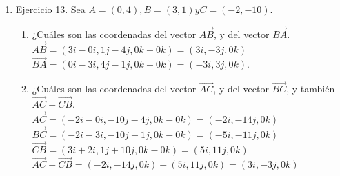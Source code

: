 \documentclass[10pt,letterpaper,fleqn]{article}
\begin{document}
\begin{enumerate}
\begin{enumerate}
          \end{enumerate}

        \item Ejercicio 13. Sea $A = (0, 4), B = (3, 1) y C = (−2, −10)$.
        \begin{enumerate}
          \item ¿Cuáles son las coordenadas del vector $\overrightarrow{AB}$, y
          del vector $\overrightarrow{BA}$. \\
          $\overrightarrow{AB} = (3i-0i,1j-4j,0k-0k) = (3i,-3j,0k)$ \\
          $\overrightarrow{BA} = (0i-3i,4j-1j,0k-0k) = (-3i,3j,0k)$.

          \item ¿Cuáles son las coordenadas del vector $\overrightarrow{AC}$, y
          del vector $\overrightarrow{BC}$, y también $\overrightarrow{AC} +
          \overrightarrow{CB}$. \\
          $\overrightarrow{AC} = (-2i-0i,-10j-4j,0k-0k) = (-2i,-14j,0k)$ \\
          $\overrightarrow{BC} = (-2i-3i,-10j-1j,0k-0k) = (-5i,-11j,0k)$ \\
          $\overrightarrow{CB} = (3i+2i,1j+10j,0k-0k) = (5i,11j,0k)$ \\
          $\overrightarrow{AC} + \overrightarrow{CB} = (-2i,-14j,0k) +
          (5i,11j,0k) = (3i,-3j,0k)$


\end{enumerate}
\end{enumerate}
\end{document}
